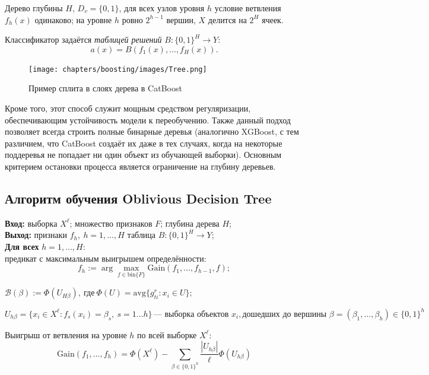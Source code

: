 Дерево глубины $H$, $D_v = \{0, 1\}$, для всех узлов уровня $h$ условие ветвления $f_h(x)$ одинаково; на уровне $h$ ровно $2^{h-1}$ вершин, $X$ делится на $2^H$ ячеек.

Классификатор задаётся \textit{таблицей решений} $B: \{0,1\}^H \to Y$:
$$
a(x) = B(f_1(x), \ldots, f_H(x)).
$$

\begin{figure}[ht]
    \centering
    \texttt{[image: chapters/boosting/images/Tree.png]}
    \caption{Пример сплита в слоях дерева в CatBoost}
\end{figure}

Кроме того, этот способ служит мощным средством регуляризации, обеспечивающим устойчивость модели к переобучению. Также данный подход позволяет всегда строить полные бинарные деревья (аналогично XGBoost, с тем различием, что CatBoost создаёт их даже в тех случаях, когда на некоторые поддеревья не попадает ни один объект из обучающей выборки). Основным критерием остановки процесса является ограничение на глубину деревьев.

\subsection*{Алгоритм обучения Oblivious Decision Tree}

\begin{tcolorbox}[colback=Lavender!10, colframe=Lavender]
\textbf{Вход:} выборка $X^\ell$; множество признаков $F$; глубина дерева $H$;\\
\textbf{Выход:} признаки $f_h, \ h = 1, \ldots, H$  таблица $B: \{0,1\}^H \to Y$;\\
\textbf{Для всех} $h = 1, \ldots, H$:\\
предикат с максимальным выигрышем определённости:
$$
f_h := \arg\max_{f \in \mathrm{bin}\{F\}} \text{Gain}(f_1, \ldots, f_{h-1}, f);
$$

\(\mathcal{B}(\beta) := \Phi(U_{H\beta}), \ \text{где} \ \Phi(U) = \text{avg}\{g_{ti}^r : x_i \in U\};\)
\end{tcolorbox}

$$
U_{h\beta} = \{x_i \in X^\ell : f_s(x_i) = \beta_s, \ s = 1 \ldots h\} \, \text{— выборка объектов } x_i,
\text{дошедших до вершины } \beta = (\beta_1, \ldots, \beta_h) \in \{0,1\}^h
$$

Выигрыш от ветвления на уровне \(h\) по всей выборке \(X^\ell\):
$$
\text{Gain}(f_1, \ldots, f_h) = \Phi(X^\ell) - \sum_{\beta \in \{0,1\}^h} \frac{|U_{h\beta}|}{\ell} \Phi(U_{h\beta})
$$

